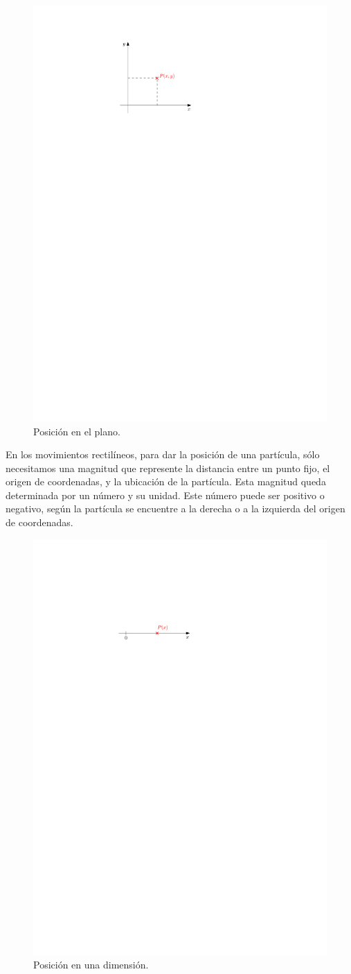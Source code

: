 \begin{figure}[H]
\begin{minipage}{.45\textwidth}
  \includegraphics[width=.9\textwidth]{img/2d.pdf}
  \caption{Posición en el plano.}
\end{minipage}
\end{figure}


En los movimientos rectilíneos, para dar la posición de una partícula, sólo necesitamos una magnitud  que represente la distancia entre un punto fijo, el origen de coordenadas, y la ubicación de la partícula. Esta magnitud queda determinada por un número y su unidad. Este número  puede ser  positivo o negativo, según la partícula se encuentre a la derecha o a la izquierda del origen de coordenadas.

\begin{figure}[H]
\center
 \includegraphics[width=.4\textwidth]{img/1d.pdf}
  \caption{Posición en una dimensión.}
\end{figure}



